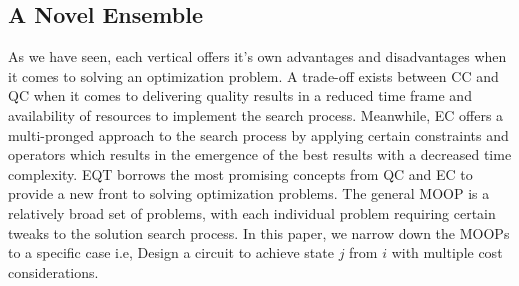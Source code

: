 \documentclass[conference]{IEEEtran}
\begin{document}
\subsection{A Novel Ensemble}
As we have seen, each vertical offers it's own advantages and disadvantages when it comes to solving an optimization problem. A trade-off exists between CC and QC when it comes to delivering quality results in a reduced time frame and availability of resources to implement the search process. Meanwhile, EC offers a multi-pronged approach to the search process by applying certain constraints and operators which results in the emergence of the best results with a decreased time complexity. EQT borrows the most promising concepts from QC and EC to provide a new front to solving optimization problems. The general MOOP is a relatively broad set of problems, with each individual problem requiring certain tweaks to the solution search process. In this paper, we narrow down the MOOPs to a specific case i.e, Design a circuit to achieve state $j$ from $i$ with multiple cost considerations. 
% 
% 
\end{document}
